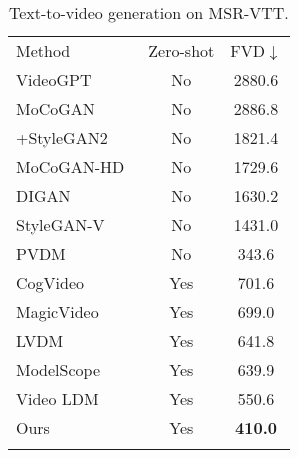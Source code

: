 \documentclass{article}
\begin{document}
\begin{table}
    \begin{minipage}{.5\linewidth}
    \centering
      \caption{Text-to-video generation on UCF101.}
        \label{tab:result_ucf101}
        \vspace{0.5mm}
        \footnotesize
        \renewcommand{\arraystretch}{1.2}
        \begin{tabular}{lcc}
        \Xhline{1.2pt}
        Method       & Zero-shot & FVD$\downarrow$    \\ 
        \Xhline{0.4pt}
        VideoGPT~\cite{yan2021videogpt}     & No        & 2880.6 \\
        MoCoGAN~\cite{2018MoCoGAN}      & No        & 2886.8 \\
        +StyleGAN2~\cite{viazovetskyi2020stylegan2}   & No        & 1821.4 \\
        MoCoGAN-HD~\cite{tian2021good_mocohd}   & No        & 1729.6 \\
        DIGAN~\cite{yu2022generating_digan}        & No        & 1630.2 \\
        StyleGAN-V~\cite{skorokhodov2022stylegan}   & No        & 1431.0 \\
        PVDM~\cite{PVDM}         & No        & 343.6  \\ 
        \Xhline{0.4pt}
        CogVideo~\cite{2023CogVideo}     & Yes       & 701.6  \\
        MagicVideo~\cite{zhou2022magicvideo}   & Yes       & 699.0  \\
        LVDM~\cite{he2022lvdm}   & Yes       & 641.8  \\
        ModelScope~\cite{VideoFusion}   & Yes       & 639.9  \\
        Video LDM~\cite{VideoLDM}    & Yes       & 550.6  \\ 
        \Xhline{0.4pt}
        Ours         & Yes       & \textbf{410.0}      \\ 
        \Xhline{1.2pt}
        \end{tabular}
    \end{minipage}
    \begin{minipage}{.5\linewidth}
        \centering
        \begin{minipage}{\textwidth}
        \vspace{0pt}
        \footnotesize
        \centering
            \caption{Text-to-video generation on MSR-VTT.}
            \label{tab:result_msrvtt}
            \vspace{0.5mm}
            \renewcommand{\arraystretch}{1.2}

\end{minipage}
\end{minipage}
\end{table}
\end{document}
